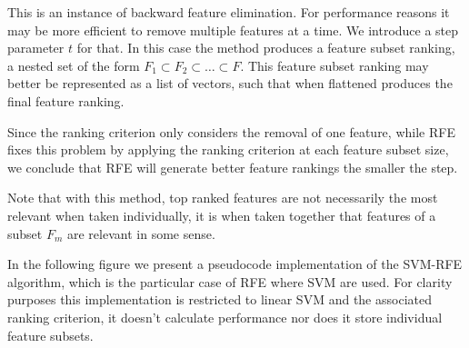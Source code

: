 This is an instance of backward feature elimination. For performance reasons it may be more efficient to remove multiple features at a time. We introduce a step parameter $t$ for that. In this case the method produces a feature subset ranking, a nested set of the form $F_1 \subset F_2 \subset \dots \subset F$. This feature subset ranking may better be represented as a list of vectors, such that when flat\-tened produces the final feature ranking.

Since the ranking criterion only considers the removal of one feature, while RFE fixes this problem by applying the ranking criterion at each feature subset size, we conclude that RFE will generate better feature rankings the smaller the step.

Note that with this method, top ranked features are not necessarily the most relevant when taken individually, it is when taken together that features of a subset $F_m$ are relevant in some sense.

In the following figure we present a pseudocode implementation of the SVM-RFE algorithm, which is the particular case of RFE where SVM are used. For clarity purposes this implementation is restricted to linear SVM and the associated ranking criterion, it doesn't calculate performance nor does it store individual feature subsets.

